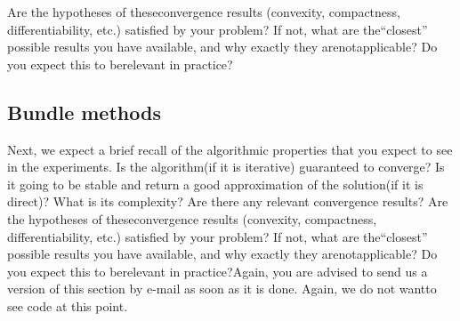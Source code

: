   Are the hypotheses of theseconvergence results (convexity, compactness, differentiability, etc.) satisfied by your problem? If not, what are the“closest” possible results you have available, and why exactly they arenotapplicable?  Do you expect this to berelevant in practice?

\subsection{Bundle methods}


Next, we expect a brief recall of the algorithmic properties that you expect to see in the experiments. Is the algorithm(if it is iterative) guaranteed to converge? Is it going to be stable and return a good approximation of the solution(if it is direct)? What is its complexity? Are there any relevant convergence results? Are the hypotheses of theseconvergence results (convexity, compactness, differentiability, etc.) satisfied by your problem? If not, what are the“closest” possible results you have available, and why exactly they arenotapplicable?  Do you expect this to berelevant in practice?Again, you are advised to send us a version of this section by e-mail as soon as it is done. Again, we do not wantto see code at this point.